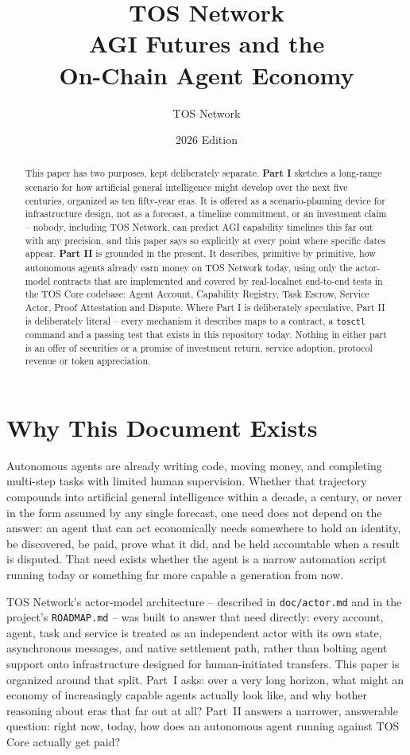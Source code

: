 \documentclass[11pt,oneside]{article}
\title{\textbf{TOS Network}\\[0.4em]\Large AGI Futures and the\\On-Chain Agent Economy}
\author{TOS Network}
\date{2026 Edition}
\begin{document}
\maketitle

\begin{abstract}
This paper has two purposes, kept deliberately separate. \textbf{Part I} sketches a
long-range scenario for how artificial general intelligence might develop over the next five
centuries, organized as ten fifty-year eras. It is offered as a scenario-planning device for
infrastructure design, not as a forecast, a timeline commitment, or an investment claim --
nobody, including TOS Network, can predict AGI capability timelines this far out with any
precision, and this paper says so explicitly at every point where specific dates appear.
\textbf{Part II} is grounded in the present. It describes, primitive by primitive, how
autonomous agents already earn money on TOS Network today, using only the actor-model
contracts that are implemented and covered by real-localnet end-to-end tests in the TOS Core
codebase: Agent Account, Capability Registry, Task Escrow, Service Actor, Proof Attestation
and Dispute. Where Part I is deliberately speculative, Part II is deliberately literal --
every mechanism it describes maps to a contract, a \texttt{tosctl} command and a passing test
that exists in this repository today. Nothing in either part is an offer of securities or a
promise of investment return, service adoption, protocol revenue or token appreciation.
\end{abstract}

\tableofcontents
\newpage

\section{Why This Document Exists}

Autonomous agents are already writing code, moving money, and completing multi-step tasks
with limited human supervision. Whether that trajectory compounds into artificial general
intelligence within a decade, a century, or never in the form assumed by any single forecast,
one need does not depend on the answer: an agent that can act economically needs somewhere to
hold an identity, be discovered, be paid, prove what it did, and be held accountable when a
result is disputed. That need exists whether the agent is a narrow automation script running
today or something far more capable a generation from now.

TOS Network's actor-model architecture -- described in
\texttt{doc/actor.md} and in the project's \texttt{ROADMAP.md} -- was built to answer that need
directly: every account, agent, task and service is treated as an independent actor with its
own state, asynchronous messages, and native settlement path, rather than bolting agent
support onto infrastructure designed for human-initiated transfers. This paper is organized
around that split. Part~I asks: over a very long horizon, what might an economy of
increasingly capable agents actually look like, and why bother reasoning about eras that far
out at all? Part~II answers a narrower, answerable question: right now, today, how does an
autonomous agent running against TOS Core actually get paid?
\end{document}
